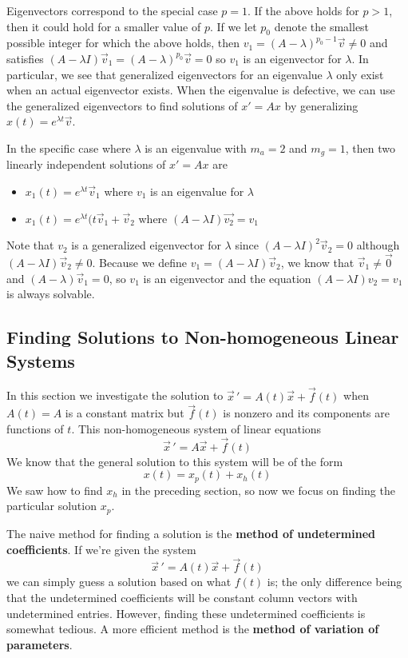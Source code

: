 \documentclass[12pt]{article}
\begin{document}
Eigenvectors correspond to the special case $p = 1$. If the above holds for $p > 1$, then it could hold for a smaller value of $p$. If we let $p_0$ denote the smallest possible integer for which the above holds, then $v_1 = (A - \lambda)^{p_0 - 1}\vec{v} \neq 0$ and satisfies $ (A-\lambda I)\vec{v}_1 = (A - \lambda)^{p_0}\vec{v} = 0$ so $v_1$ is an eigenvector for $\lambda$. In particular, we see that generalized eigenvectors for an eigenvalue $\lambda$ only exist when an actual eigenvector exists. When the eigenvalue is defective, we can use the generalized eigenvectors to find solutions of $x' = Ax$ by generalizing $x(t) = e^{\lambda t}\vec{v}$.

In the specific case where $\lambda$ is an eigenvalue with $m_a = 2$ and $m_g = 1$, then two linearly independent solutions of $x' = Ax$ are \begin{itemize}
    \item $x_1(t) = e^{\lambda t}\vec{v}_1$ where $v_1$ is an eigenvalue for $\lambda$
    \item $x_1(t) = e^{\lambda t}(t\vec{v}_1 + \vec{v}_2$ where $(A-\lambda I)\vec{v_2} = v_1$
\end{itemize} Note that $v_2$ is a generalized eigenvector for $\lambda$ since $(A - \lambda I)^2 \vec{v}_2 = 0$ although $(A - \lambda I) \vec{v}_2 \neq 0$. Because we define $v_1 = (A - \lambda I) \vec{v}_2$, we know that $\vec{v}_1 \neq \vec{0}$ and $(A - \lambda)\vec{v}_1 = 0$, so $v_1$ is an eigenvector and the equation $(A - \lambda I)v_2 = v_1$ is always solvable.

\subsection{Finding Solutions to Non-homogeneous Linear Systems}

In this section we investigate the solution to $\vec{x} \, ' = A(t)\vec{x} + \vec{f}(t)$ when $A(t) = A$ is a constant matrix but $\vec{f}(t)$ is nonzero and its components are functions of $t$. This non-homogeneous system of linear equations $$\vec{x} \, ' = A\vec{x} + \vec{f}(t)$$ We know that the general solution to this system will be of the form $$x(t) = x_p(t) + x_h(t)$$ We saw how to find $x_h$ in the preceding section, so now we focus on finding the particular solution $x_p$.

The naive method for finding a solution is the \textbf{method of undetermined coefficients}. If we're given the system $$\vec{x} \, ' = A(t)\vec{x} + \vec{f}(t)$$ we can simply guess a solution based on what $f(t)$ is; the only difference being that the undetermined coefficients will be constant column vectors with undetermined entries. However, finding these undetermined coefficients is somewhat tedious. A more efficient method is the \textbf{method of variation of parameters}.
\end{document}
